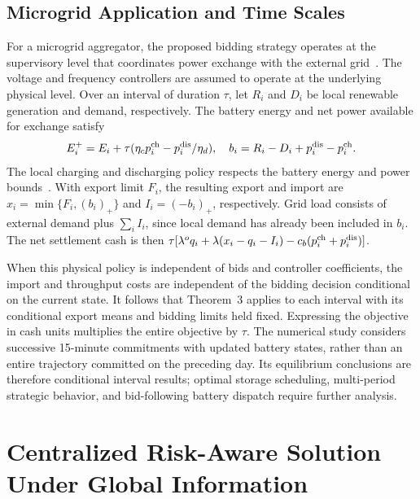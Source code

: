 \documentclass[journal]{IEEEtran}
\begin{document}
\subsection{Microgrid Application and Time Scales}
For a microgrid aggregator, the proposed bidding strategy operates at the supervisory level that coordinates power exchange with the external grid~\cite{Guerrero2011Hierarchy}. The voltage and frequency controllers are assumed to operate at the underlying physical level. Over an interval of duration $\tau$, let $R_i$ and $D_i$ be local renewable generation and demand, respectively. The battery energy and net power available for exchange satisfy
\begin{equation}
 E_i^+=E_i+\tau(\eta_c p_i^{\rm ch}-p_i^{\rm dis}/\eta_d),\quad
 b_i=R_i-D_i+p_i^{\rm dis}-p_i^{\rm ch}.
 \label{eq:microgrid_state}
\end{equation}
The local charging and discharging policy respects the battery energy and power bounds~\cite{DiOrio2015Battery}. With export limit $F_i$, the resulting export and import are $x_i=\min\{F_i,(b_i)_+\}$ and $I_i=(-b_i)_+$, respectively. Grid load consists of external demand plus $\sum_iI_i$, since local demand has already been included in $b_i$. The net settlement cash is then $\tau[\lambda^o q_i+\lambda(x_i-q_i-I_i)-c_b(p_i^{\rm ch}+p_i^{\rm dis})]$.

When this physical policy is independent of bids and controller coefficients, the import and throughput costs are independent of the bidding decision conditional on the current state. It follows that Theorem~3 applies to each interval with its conditional export means and bidding limits held fixed. Expressing the objective in cash units multiplies the entire objective by $\tau$. The numerical study considers successive 15-minute commitments with updated battery states, rather than an entire trajectory committed on the preceding day. Its equilibrium conclusions are therefore conditional interval results; optimal storage scheduling, multi-period strategic behavior, and bid-following battery dispatch require further analysis.

\section{Centralized Risk-Aware Solution Under Global Information}
\end{document}
